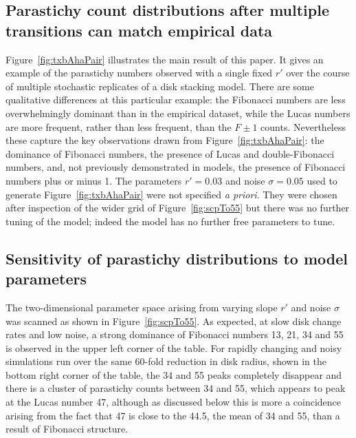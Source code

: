 \clearpage
\subsection{Parastichy count distributions after multiple transitions can match empirical data}
Figure~\ref{fig:txbAhaPair} illustrates the main result of this paper. It gives an example of the parastichy numbers observed with a single fixed $r'$ over the course of multiple stochastic replicates of a disk stacking model.    There are some qualitative differences at this particular example: the Fibonacci numbers are less overwhelmingly dominant than in the empirical dataset, while the Lucas numbers are more frequent, rather than less frequent, than the $F\pm1$ counts. Nevertheless these capture the key observations drawn from  Figure~\ref{fig:txbAhaPair}: the dominance of Fibonacci numbers, the  presence of Lucas and double-Fibonacci numbers, and,  not previously demonstrated in models, the presence of Fibonacci numbers plus or minus 1. 
The parameters $r'=0.03$ and noise $\sigma=0.05$ used to generate Figure~\ref{fig:txbAhaPair} were not specified \textit{a priori}. They were chosen after inspection of the wider grid of Figure~\ref{fig:scpTo55} but there was no further tuning of the model;  indeed the model has no further free parameters to tune.


\subsection{Sensitivity of parastichy distributions to model parameters}

The two-dimensional parameter space arising from varying slope $r'$ and noise $\sigma$ was scanned as shown in  Figure~\ref{fig:scpTo55}. As expected, at slow disk change rates and low noise, a strong dominance of Fibonacci numbers 13, 21, 34 and 55 is observed in the upper left corner of the table. For rapidly changing and noisy simulations run over the same 60-fold reduction in disk radius, shown in the bottom right corner of the table, the 34 and 55 peaks completely disappear and there is a cluster of parastichy counts between 34 and 55, which appears to peak at the Lucas number 47, although as discussed below this is more a coincidence arising from the fact that 47 is close to the 44.5, the mean of 34 and 55, than a result of Fibonacci structure. 

